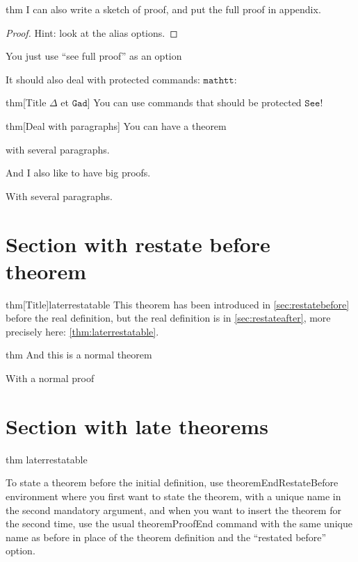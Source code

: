 \documentclass{article}
\begin{document}
\begin{theoremEnd}{thm}
  I can also write a sketch of proof, and put the full proof in appendix.
\end{theoremEnd}
\begin{proof}
  Hint: look at the alias options.
\end{proof}
\begin{proofEnd}
  You just use ``see full proof'' as an option
\end{proofEnd}

It should also deal with protected commands: $\mathtt{mathtt}$:
\begin{theoremEnd}[end]{thm}[Title $\Delta$ et $\mathtt{Gad}$]
  You can use commands that should be protected $\mathtt{See}$!
\end{theoremEnd}

\begin{theoremEnd}[end]{thm}[Deal with paragraphs]
  You can have a theorem

  with several paragraphs.
\end{theoremEnd}
\begin{proofEnd}
  And I also like to have big proofs.
  
  With several paragraphs.
\end{proofEnd}

\section{Section with restate before theorem}\label{sec:restatebefore}

\begin{theoremEndRestateBefore}{thm}[Title]{laterrestatable}
  \label{thm:laterrestatable}
  This theorem has been introduced in \autoref{sec:restatebefore} before the real definition, but the real definition is in \autoref{sec:restateafter}, more precisely here: \autoref{thm:laterrestatable}.
\end{theoremEndRestateBefore}


\begin{theoremEnd}{thm}
  And this is a normal theorem  
\end{theoremEnd}
\begin{proofEnd}
  With a normal proof  
\end{proofEnd}


\section{Section with late theorems}\label{sec:restateafter}
\begin{theoremEnd}{thm}
  laterrestatable
\end{theoremEnd}
\begin{proofEnd}
  To state a theorem before the initial definition, use theoremEndRestateBefore environment where you first want to state the theorem, with a unique name in the second mandatory argument, and when you want to insert the theorem for the second time, use the usual theoremProofEnd command with the same unique name as before in place of the theorem definition and the ``restated before'' option.  
\end{proofEnd}
\end{document}
